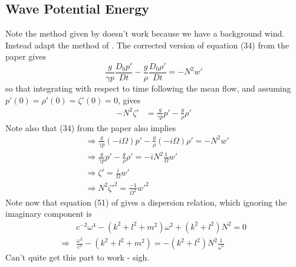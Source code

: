 \documentclass[12pt]{article}
\begin{document}
\subsection{Wave Potential Energy}
Note the method given by \citet{nappo02} doesn't work because we have a background wind. Instead adapt the method of \citet{lighthill78}. The corrected version of equation (34) from the paper gives
\begin{equation}
\frac{g}{\gamma p} \frac{D_0 p'}{Dt} - \frac{g}{\rho}\frac{D_0 \rho'}{Dt} = -N^2 w'
\end{equation}
so that integrating with respect to time following the mean flow, and assuming $p'(0)=\rho'(0)=\zeta'(0)=0$, gives
\begin{align*}
-N^2 \zeta' &= \frac{g}{\gamma p} p' - \frac{g}{\rho}\rho' 
\end{align*}
Note also that (34) from the paper also implies
\begin{align*}
& \Rightarrow \frac{g}{\gamma p} (-i\Omega) p' - \frac{g}{\rho}(-i\Omega)\rho' = -N^2 w' \\
&\Rightarrow{} \frac{g}{\gamma p} p' - \frac{g}{\rho}\rho' = -iN^2\frac{1}{\Omega} w' \\
& \Rightarrow \zeta'= \frac{i}{\Omega} w' \\
& \Rightarrow N^2 \zeta'^2 = \frac{-1}{\Omega^2} w'^2
\end{align*}
Note now that equation (51) of \citet{lighthill78} gives a dispersion relation, which ignoring the imaginary component is 
\begin{align*}
& c^{-2}\omega^4 - (k^2+l^2+m^2)\omega^2 + (k^2+l^2)N^2 = 0 \\
\Rightarrow & \frac{\omega^2}{c^2} - (k^2+l^2+m^2) = - (k^2+l^2)N^2 \frac{1}{\omega^2}
\end{align*}
Can't quite get this part to work - sigh.
\end{document}
